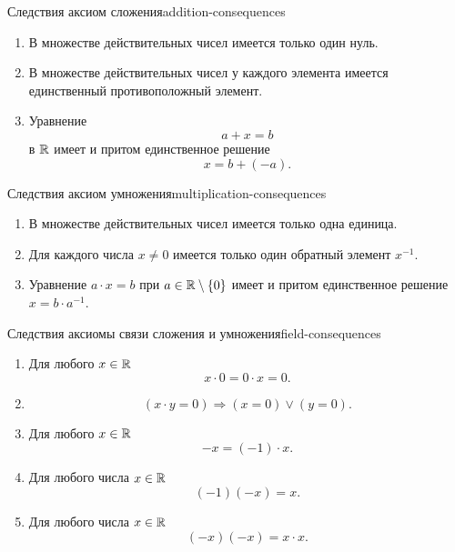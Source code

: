 \begin{properties}{Следствия аксиом сложения}{addition-consequences}
  \begin{enumerate}[label=\arabic*${}^{\circ}$.]
    \item В множестве действительных чисел имеется только один нуль.\par
    \item В множестве действительных чисел у каждого элемента имеется
      единственный противоположный элемент.\par
    \item Уравнение
      \[
        a+x=b
      \]
      в $\mathbb{R}$ имеет и притом единственное решение
      \[
        x=b+(-a).
      \]
  \end{enumerate}
\end{properties}

\begin{properties}{Следствия аксиом умножения}{multiplication-consequences}
  \begin{enumerate}[label=\arabic*${}^{\circ}$.]
    \item В множестве действительных чисел имеется только одна единица.\par
    \item Для каждого числа $x\ne0$ имеется только один обратный элемент
      $x^{-1}$.\par
    \item Уравнение $a\cdot x=b$ при $a\in\mathbb{R}\setminus\{0\}$ имеет и притом
      единственное решение $x=b\cdot a^{-1}$.
  \end{enumerate}
\end{properties}

\begin{properties}{Следствия аксиомы связи сложения и умножения}{field-consequences}
  \begin{enumerate}[label=\arabic*${}^{\circ}$.]
    \item Для любого $x\in\mathbb{R}$
      \[
        x\cdot0=0\cdot x=0.
      \]\par
    \item
      \[
        (x\cdot y=0)\Rightarrow(x=0)\lor(y=0).
      \]\par
    \item Для любого $x\in\mathbb{R}$
      \[
        -x=(-1)\cdot x.
      \]\par
    \item Для любого числа $x\in\mathbb{R}$
      \[
        (-1)(-x)=x.
      \]\par
    \item Для любого числа $x\in\mathbb{R}$
      \[
        (-x)(-x)=x\cdot x.
      \]
  \end{enumerate}
\end{properties}

